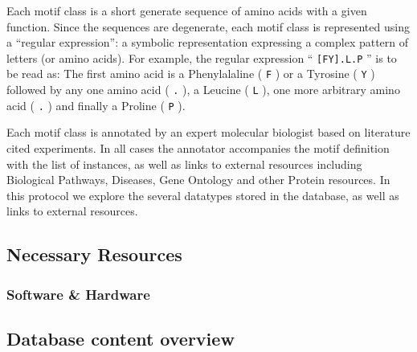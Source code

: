 \documentclass[12pt]{article}
\newcounter{proto}
\newcommand\code[1]{%
    \texttt{#1}{}%
}%
\begin{document}
Each motif class is a short generate sequence of amino acids with a given
function. Since the sequences are degenerate, each motif class is represented
using a ``regular expression'': a symbolic representation expressing a complex
pattern of letters (or amino acids). For example, the regular expression
``\code{[FY].L.P}'' is to be read as: The first amino acid is a Phenylalaline (\code{F}) or a
Tyrosine (\code{Y}) followed by any one amino acid (\code{.}), a Leucine (\code{L}), one more
arbitrary amino acid (\code{.}) and finally a Proline (\code{P}).

Each motif class is annotated by an expert molecular biologist based on
literature cited experiments.
In all cases the annotator accompanies the motif definition with the list of
instances, as well as links to external resources including Biological
Pathways, Diseases, Gene Ontology and other Protein resources. In this protocol
we explore the several datatypes stored in the database, as well as links to
external resources.

%
%
\subsection*{Necessary Resources}
\subsubsection*{Software \& Hardware}



%
%
\subsection*{Database content overview}%
\label{subsec:explore_content_database}%
\end{document}
